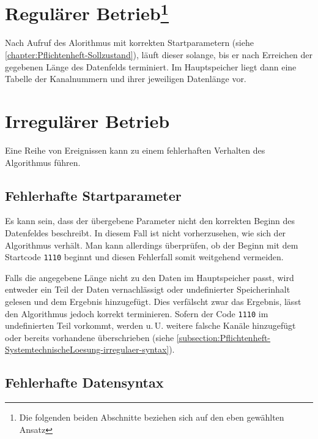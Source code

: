 

\section[Regulärer Betrieb]{Regulärer Betrieb\footnote{Die folgenden beiden Abschnitte beziehen sich auf den eben gewählten Ansatz}}
\label{section:Pflichtenheft-SystemtechnischeLoesung-regulaer}

Nach Aufruf des Alorithmus mit korrekten Startparametern (siehe \autoref{chapter:Pflichtenheft-Sollzustand}), läuft dieser solange, bis er nach Erreichen der gegebenen Länge des Datenfelds terminiert. Im Hauptspeicher liegt dann eine Tabelle der Kanalnummern und ihrer jeweiligen Datenlänge vor.


\section{Irregulärer Betrieb}
\label{section:Pflichtenheft-SystemtechnischeLoesung-irregulaer}

Eine Reihe von Ereignissen kann zu einem fehlerhaften Verhalten des Algorithmus führen.

\subsection{Fehlerhafte Startparameter}
\label{subsection:Pflichtenheft-SystemtechnischeLoesung-irregulaer-startparameter}

Es kann sein, dass der übergebene Parameter nicht den korrekten Beginn des Datenfeldes beschreibt. In diesem Fall ist nicht vorherzusehen, wie sich der Algorithmus verhält. Man kann allerdings überprüfen, ob der Beginn mit dem Startcode \texttt{1110} beginnt und diesen Fehlerfall somit weitgehend vermeiden.

Falls die angegebene Länge nicht zu den Daten im Hauptspeicher passt, wird entweder ein Teil der Daten vernachlässigt oder undefinierter Speicherinhalt gelesen und dem Ergebnis hinzugefügt. Dies verfälscht zwar das Ergebnis, lässt den Algorithmus jedoch korrekt terminieren. Sofern der Code \texttt{1110} im undefinierten Teil vorkommt, werden u.\,U. weitere falsche Kanäle hinzugefügt oder bereits vorhandene überschrieben (siehe \autoref{subsection:Pflichtenheft-SystemtechnischeLoesung-irregulaer-syntax}).

\subsection{Fehlerhafte Datensyntax}
\label{subsection:Pflichtenheft-SystemtechnischeLoesung-irregulaer-syntax}

